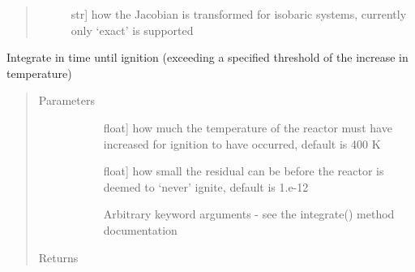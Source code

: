 \documentclass[letterpaper,10pt,english]{sphinxmanual}
\begin{document}
\begin{fulllineitems}
\begin{quote}
\begin{description}
\begin{description}
\item[{}] \leavevmode{[}str{]}
how the Jacobian is transformed for isobaric systems, currently only ‘exact’ is supported

\end{description}

\end{description}\end{quote}

\begin{fulllineitems}
\label{\detokenize{spitfire.chemistry.reactors:spitfire.chemistry.reactors.HomogeneousReactor.compute_ignition_delay}}
Integrate in time until ignition (exceeding a specified threshold of the increase in temperature)
\begin{quote}\begin{description}
\item[{Parameters}] \leavevmode\begin{description}
\item[{}] \leavevmode{[}float{]}
how much the temperature of the reactor must have increased for ignition to have occurred, default is 400 K

\item[{}] \leavevmode{[}float{]}
how small the residual can be before the reactor is deemed to ‘never’ ignite, default is 1.e-12

\item[{}] \leavevmode
Arbitrary keyword arguments - see the integrate() method documentation

\end{description}

\item[{Returns}] \leavevmode\begin{description}
\item[{}] \leavevmode
\end{description}

\end{description}\end{quote}


\end{fulllineitems}
\end{fulllineitems}
\end{document}
